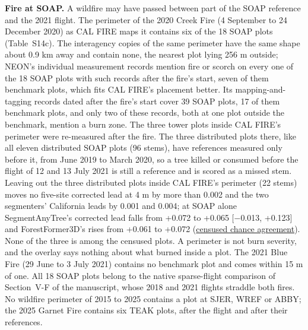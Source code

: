 \documentclass[10pt]{article}
\begin{document}
\textbf{Fire at SOAP.} A wildfire may have passed between part of the SOAP reference
and the 2021 flight. The perimeter of the 2020 Creek Fire (4 September to 24
December 2020) as CAL FIRE maps it contains six of the 18 SOAP plots (Table~S14c). The interagency copies of the same perimeter have the same shape about
0.9 km away and contain none, the nearest plot lying 256 m outside; NEON's
individual measurement records mention fire or scorch on every one of the 18
SOAP plots with such records after the fire's start, seven of them benchmark
plots, which fits CAL FIRE's placement better. Its mapping-and-tagging records
dated after the fire's start cover 39 SOAP plots, 17 of them benchmark plots,
and only two of these records, both at one plot outside the benchmark, mention
a burn zone. The three tower plots inside CAL FIRE's perimeter were re-measured
after the fire. The three distributed plots there, like all eleven distributed
SOAP plots (96 stems), have references measured only before it, from June 2019
to March 2020, so a tree killed or consumed before the flight of 12 and 13 July
2021 is still a reference and is scored as a missed stem. Leaving out the three
distributed plots inside CAL FIRE's perimeter (22 stems) moves no five-site
corrected lead at 4 m by more than 0.002 and the two segmenters' California
leads by 0.001 and 0.004; at SOAP alone SegmentAnyTree's corrected lead falls
from +0.072 to +0.065 [$-$0.013, +0.123] and ForestFormer3D's rises from +0.061 to
+0.072 (\href{https://github.com/devakellc/lidar-tree-benchmark/blob/main/results/censused-chance-agreement-results.md}{censused chance
agreement}). None of the three
is among the censused plots. A perimeter is not burn severity, and the overlay
says nothing about what burned inside a plot. The 2021 Blue Fire (29 June to 3
July 2021) contains no benchmark plot and comes within 15 m of one. All 18 SOAP
plots belong to the native sparse-flight comparison of Section~V-F of the
manuscript, whose 2018 and 2021 flights straddle both fires. No wildfire
perimeter of 2015 to 2025 contains a plot at SJER, WREF or ABBY; the 2025 Garnet
Fire contains six TEAK plots, after the flight and after their references.
\end{document}
